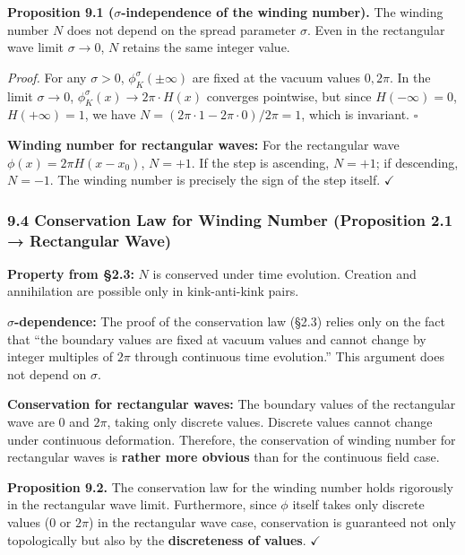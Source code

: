 \documentclass[a4paper,11pt]{article}
\begin{document}
\textbf{Proposition 9.1 (\(\sigma\)-independence of the winding
number).} The winding number \(N\) does not depend on the spread
parameter \(\sigma\). Even in the rectangular wave limit
\(\sigma \to 0\), \(N\) retains the same integer value.

\emph{Proof.} For any \(\sigma > 0\), \(\phi_K^\sigma(\pm\infty)\) are
fixed at the vacuum values \(0, 2\pi\). In the limit \(\sigma \to 0\),
\(\phi_K^\sigma(x) \to 2\pi \cdot H(x)\) converges pointwise, but since
\(H(-\infty) = 0\), \(H(+\infty) = 1\), we have
\(N = (2\pi \cdot 1 - 2\pi \cdot 0)/2\pi = 1\), which is invariant.
\(\square\)

\textbf{Winding number for rectangular waves:} For the rectangular wave
\(\phi(x) = 2\pi H(x - x_0)\), \(N = +1\). If the step is ascending,
\(N = +1\); if descending, \(N = -1\). The winding number is precisely
the sign of the step itself. \(\checkmark\)

\subsubsection{9.4 Conservation Law for Winding Number (Proposition 2.1
→ Rectangular
Wave)}\label{conservation-law-for-winding-number-proposition-2.1-rectangular-wave}

\textbf{Property from §2.3:} \(N\) is conserved under time evolution.
Creation and annihilation are possible only in kink-anti-kink pairs.

\textbf{\(\sigma\)-dependence:} The proof of the conservation law (§2.3)
relies only on the fact that ``the boundary values are fixed at vacuum
values and cannot change by integer multiples of \(2\pi\) through
continuous time evolution.'' This argument does not depend on
\(\sigma\).

\textbf{Conservation for rectangular waves:} The boundary values of the
rectangular wave are \(0\) and \(2\pi\), taking only discrete values.
Discrete values cannot change under continuous deformation. Therefore,
the conservation of winding number for rectangular waves is
\textbf{rather more obvious} than for the continuous field case.

\textbf{Proposition 9.2.} The conservation law for the winding number
holds rigorously in the rectangular wave limit. Furthermore, since
\(\phi\) itself takes only discrete values (\(0\) or \(2\pi\)) in the
rectangular wave case, conservation is guaranteed not only topologically
but also by the \textbf{discreteness of values}. \(\checkmark\)
\end{document}
